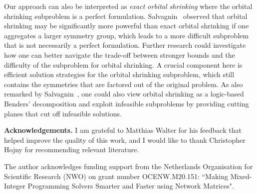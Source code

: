 \documentclass[pdflatex,sn-mathphys-num]{sn-jnl}%
\theoremstyle{thmstyleone}%
\theoremstyle{thmstylethree}%
\theoremstyle{thmstyletwo}%
\begin{document}
Our approach can also be interpreted as \emph{exact orbital shrinking} where the orbital shrinking subproblem is a perfect formulation. Salvagnin~\cite{Salvagnin2013} observed that orbital shrinking may be significantly more powerful than exact orbital shrinking if one aggregates a larger symmetry group, which leads to a more difficult subproblem that is not necessarily a perfect formulation. Further research could investigate how one can better navigate the trade-off between stronger bounds and the difficulty of the subproblem for orbital shrinking. A crucial component here is efficient solution strategies for the orbital shrinking subproblem, which still contains the symmetries that are factored out of the original problem. As also remarked by Salvagnin~\cite{Salvagnin2013}, one could also view orbital shrinking as a logic-based Benders' decomposition and exploit infeasible subproblems by providing cutting planes that cut off infeasible solutions.

\medskip 
\noindent
\textbf{Acknowledgements.}
I am grateful to Matthias Walter for his feedback that helped improve the quality of this work, and I would like to thank Christopher Hojny for recommending relevant literature.

The author acknowledges funding support from the Netherlands Organisation for Scientific Research (NWO) on grant number OCENW.M20.151: ``Making Mixed-Integer Programming Solvers Smarter and Faster using Network Matrices".

% 

\end{document}
